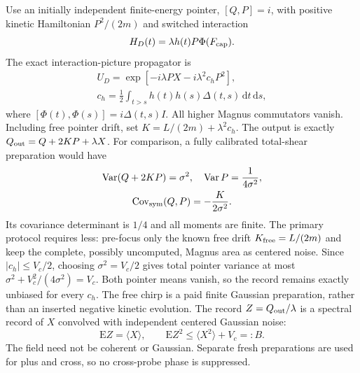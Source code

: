 Use an initially independent finite-energy pointer, $[Q,P]=i$, with
positive kinetic Hamiltonian $P^2/(2m)$ and switched interaction
\begin{equation}
 H_D(t)=\lambda h(t)P\Phi(F_{\rm cap}).
\end{equation}
The exact interaction-picture propagator is
\begin{equation}
 \begin{gathered}
 U_D=\exp[-i\lambda PX-i\lambda^2c_hP^2],\\
 c_h=\frac12\int_{t>s}h(t)h(s)\Delta(t,s)\,\mathrm dt\,\mathrm ds,
 \end{gathered}
\end{equation}
where $[\Phi(t),\Phi(s)]=i\Delta(t,s)I$.  All higher Magnus
commutators vanish.  Including free pointer drift, set
$K=L/(2m)+\lambda^2c_h$.  The output is exactly
$Q_{\rm out}=Q+2KP+\lambda X$.
For comparison, a fully calibrated total-shear preparation would have
\begin{equation}
 \begin{gathered}
 \operatorname{Var}(Q+2KP)=\sigma^2,\quad
 \operatorname{Var}P=\frac1{4\sigma^2},\\
 \operatorname{Cov}_{\rm sym}(Q,P)=-\frac K{2\sigma^2}.
 \end{gathered}
\end{equation}
Its covariance determinant is $1/4$ and all moments are finite.  The
primary protocol requires less: pre-focus only the known free drift
$K_{\rm free}=L/(2m)$ and keep the complete, possibly uncomputed, Magnus
area as centered noise.  Since $|c_h|\leq V_c/2$, choosing
$\sigma^2=V_c/2$ gives total pointer variance at most
$\sigma^2+V_c^2/(4\sigma^2)=V_c$.  Both pointer means vanish, so the
record remains exactly unbiased for every $c_h$.  The free chirp is a
paid finite Gaussian preparation, rather than an inserted negative kinetic
evolution.  The record $Z=Q_{\rm out}/\lambda$ is a spectral record of
$X$ convolved with independent centered Gaussian noise:
\begin{equation}
 \mathrm E Z=\langle X\rangle,\qquad
 \mathrm E Z^2\leq\langle X^2\rangle+V_c=:B.
\end{equation}
The field need not be coherent or Gaussian.  Separate fresh preparations
are used for plus and cross, so no cross-probe phase is suppressed.

